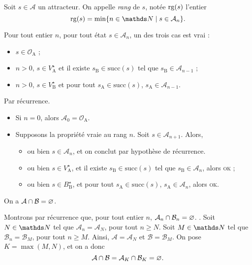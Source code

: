 \begin{defn}
	Soit $s \in \mathcal{A}$ un attracteur. On appelle \textit{rang} de $s$, notée $\operatorname{rg}(s)$\/ l'entier  \[
		\rg(s) = \min \{n \in \N  \mid s \in \mathcal{A}_n\}
	.\]
\end{defn}

\begin{lem}
	Pour tout entier $n$, pour tout état $s \in \mathcal{A}_n$,  un des trois cas est vrai :
	\begin{itemize}
		\item $s \in \mathcal{O}_\mathrm{A}$\/ ;
		\item $n > 0$, $s \in V_\mathrm{A}^\star$ et il existe $s_\mathrm{B} \in \mathrm{succ}(s)$\/ tel que $s_\mathrm{B} \in \mathcal{A}_{n-1}$\/ ;
		\item $n > 0$, $s \in V_\mathrm{B}^\star$ et pour tout $s_\mathrm{A} \in \mathrm{succ}(s)$, $s_\mathrm{A} \in \mathcal{A}_{n-1}$.
	\end{itemize}
\end{lem}

\begin{prv}
	Par récurrence.
	\begin{itemize}
		\item Si $n = 0$, alors $\mathcal{A}_0 = \mathcal{O}_\mathrm{A}$.
		\item Supposons la propriété vraie au rang $n$. Soit $s \in \mathcal{A}_{n+1}$. Alors,
			\begin{itemize}
				\item ou bien $s \in \mathcal{A}_n$, et on conclut par hypothèse de récurrence.
				\item ou bien $s \in V_\mathrm{A}^\star$, et il existe $s_\mathrm{B} \in \mathrm{succ}(s)$\/ tel que $s_\mathrm{B} \in \mathcal{A}_n$, alors \textsc{ok} ;
				\item ou bien $s \in B_\mathrm{B}^\star$, et pour tout $s_\mathrm{A} \in \mathrm{succ}(s)$, $s_\mathrm{A} \in \mathcal{A}_n$, alors \textsc{ok}.
			\end{itemize}
	\end{itemize}
\end{prv}

\begin{prop}
	On a $\mathcal{A} \cap \mathcal{B} = \varnothing$.
\end{prop}

\begin{prv}
	Montrons par récurrence que, pour tout entier $n$, $\mathcal{A}_n \cap \mathcal{B}_n = \varnothing$. .
	Soit $N \in \N$ tel que $\mathcal{A}_n = \mathcal{A}_N$, pour tout $n \ge N$.
	Soit $M \in \N$ tel que $\mathcal{B}_n = \mathcal{B}_M$, pour tout $n \ge M$.
	Ainsi, $\mathcal{A} = \mathcal{A}_N$\/ et $\mathcal{B} = \mathcal{B}_M$.
	On pose $K = \max(M, N)$, et on a donc \[
		\mathcal{A} \cap \mathcal{B} = \mathcal{A}_K \cap \mathcal{B}_K = \varnothing
	.\]
\end{prv}

